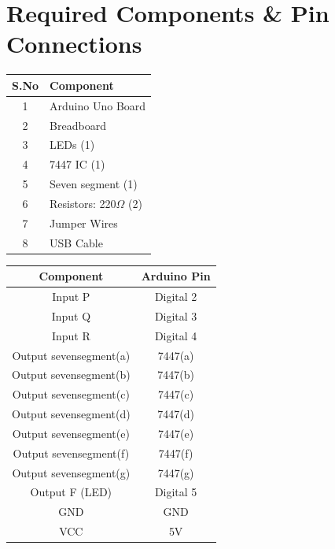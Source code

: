 \documentclass[a4paper,12pt]{article}
\begin{document}
\section*{Required Components \& Pin Connections}
\begin{center}
\begin{minipage}{0.45\textwidth}
\begin{table}[H]
\centering
\begin{tabular}{|c|l|}
\hline
\textbf{S.No} & \textbf{Component} \\ \hline
1 & Arduino Uno Board \\
2 & Breadboard \\
3 & LEDs (1) \\
4 & 7447 IC (1) \\
5 & Seven segment (1) \\
6 & Resistors: 220$\Omega$ (2) \\
7 & Jumper Wires \\
8 & USB Cable \\
\hline
\end{tabular}
\end{table}
\end{minipage}
\hspace{0.05\textwidth}
\begin{minipage}{0.45\textwidth}
\begin{table}[H]
\centering
\begin{tabular}{|c|c|}
\hline
\textbf{Component} & \textbf{Arduino Pin} \\ \hline
Input P  & Digital 2 \\
Input Q  & Digital 3 \\
Input R  & Digital 4 \\
Output sevensegment(a) & 7447(a)\\
Output sevensegment(b) & 7447(b)\\
Output sevensegment(c) & 7447(c)\\
Output sevensegment(d) & 7447(d)\\
Output sevensegment(e) & 7447(e)\\
Output sevensegment(f) & 7447(f)\\
Output sevensegment(g) & 7447(g)\\
Output F (LED) & Digital 5 \\
GND & GND \\
VCC & 5V \\
\hline
\end{tabular}
\end{table}
\end{minipage}
\end{center}
\end{document}
